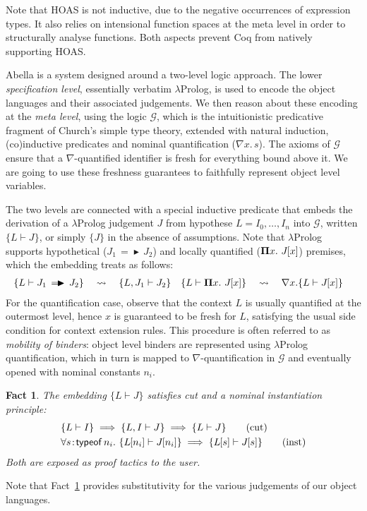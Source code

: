 \documentclass[a4paper,UKenglish]{lipics-v2016}
\newcommand{\ms}{\,}
\newcommand{\mrel}[1]{\mathrel{\ms #1 \ms}}
\newcommand{\mAll}[1]{\ensuremath{\forall} #1.\ms\ms}
\newcommand{\of}{\ensuremath{\!:\!}}
\newcommand{\lpPi}[1]{\mathbf{\Pi} #1.\ms\ms}
\newcommand{\lpImp}{\mrel{=\!\blacktriangleright}}
\newcommand{\subst}[1]{\hphantom{|}\!\![{#1}]}
\theoremstyle{plain}
\newtheorem{fact}[theorem]{Fact}
\begin{document}
Note that HOAS is not inductive, due to the negative occurrences of expression types.
It also relies on intensional function spaces at the meta level in order to structurally analyse functions.
Both aspects prevent Coq from natively supporting HOAS.

Abella is a system designed around a two-level logic approach.
The lower \emph{specification level}, essentially verbatim $\lambda$Prolog, is used to encode the object languages and their associated judgements.
We then reason about these encoding at the \emph{meta level}, using the logic $\mathcal{G}$, which is the intuitionistic predicative fragment of Church's simple type theory, extended with natural induction, (co)inductive predicates and nominal quantification ($\nabla x . \ms s$).
The axioms of $\mathcal{G}$ ensure that a $\nabla$-quantified identifier is fresh for everything bound above it.
We are going to use these freshness guarantees to faithfully represent object level variables.

\newcommand{\aje}[1]{\ensuremath{\{#1\}}}
\newcommand{\aj}[2]{\ensuremath{\{#1 \vdash #2\}}}
The two levels are connected with a special inductive predicate that embeds the derivation of a $\lambda$Prolog judgement $J$ from hypothese $L = I_0,\ldots,I_n$ into $\mathcal{G}$, written $\aj{L}{J}$, or simply $\aje{J}$ in the absence of assumptions.
Note that $\lambda$Prolog supports hypothetical ($J_1 \lpImp J_2$) and locally quantified ($\lpPi{x} J\subst{x}$) premises, which the embedding treats as follows:
\begin{align*}
  \aj{L}{J_1 \lpImp J_2} &\quad\leadsto\quad \aj{L, J_1}{J_2} & \aj{L}{\lpPi{x} J\subst{x}}&\quad\leadsto\quad \nabla x. \aj{L}{J\subst{x}}
\end{align*}
For the quantification case, observe that the context $L$ is usually quantified at the outermost level, hence $x$ is guaranteed to be fresh for $L$, satisfying the usual side condition for context extension rules.
This procedure is often referred to as \emph{mobility of binders}: object level binders are represented using $\lambda$Prolog quantification, which in turn is mapped to $\nabla$-quantification in $\mathcal{G}$ and eventually opened with nominal constants $n_i$.
\begin{fact}
  \label{fac:ab-cut-inst}
  The embedding $\aj{L}{J}$ satisfies cut and a nominal instantiation principle:
  \begin{align*}
    &\aj{L}{I} \implies \aj{L,I}{J} \implies \aj{L}{J} \tag{cut} \\
    &\mAll{s \of \mathsf{typeof}\, n_i} \aj{L\subst{n_i}}{J\subst{n_i}} \implies \aj{L\subst{s}}{J\subst{s}} \tag{inst}
  \end{align*}
  Both are exposed as proof tactics to the user.\hfill\qedsymbol
\end{fact}
Note that Fact~\ref{fac:ab-cut-inst} provides substitutivity for the various judgements of our object languages.
\end{document}
